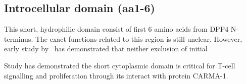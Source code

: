 \subsection{Introcellular domain (aa1-6)}

This short, hydrophilic domain consist of first 6 amino acids from DPP4 N-terminus. The exact functions related to this region is still unclear. However, early study by~\citet{Hong1990} has demonstrated that neither exclusion of initial 

Study has demonstrated the short cytoplasmic domain is critical for T-cell signalling and proliferation through its interact with protein CARMA-1. \cite{Ohnuma_2007}